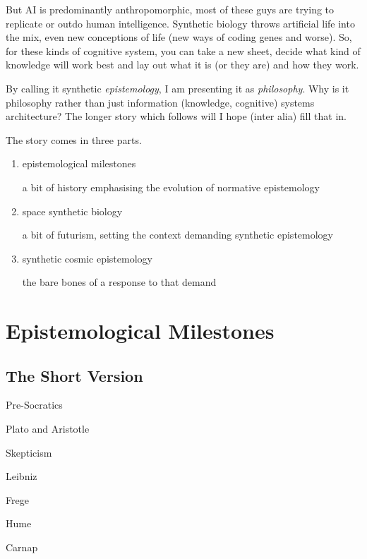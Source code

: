 \documentclass[14pt,titlepage]{extarticle}
\begin{document}
But AI is predominantly anthropomorphic, most of these guys are trying to replicate or outdo human intelligence.
Synthetic biology throws artificial life into the mix, even new conceptions of life (new ways of coding genes and worse).
So, for these kinds of cognitive system, you can take a new sheet, decide what kind of knowledge will work best and lay out what it is (or they are) and how they work.

By calling it synthetic {\it epistemology}, I am presenting it as {\it philosophy}.
Why is it philosophy rather than just information (knowledge, cognitive) systems architecture?
The longer story which follows will I hope (inter alia) fill that in.

The story comes in three parts.
\begin{enumerate}
\item epistemological milestones

  a bit of history emphasising the evolution of normative epistemology
  
\item space synthetic biology

  a bit of futurism, setting the context demanding synthetic epistemology
  
\item synthetic cosmic epistemology

  the bare bones of a response to that demand

\end{enumerate}

\section{Epistemological Milestones}

\subsection{The Short Version}

\begin{description}
\item Pre-Socratics
\item Plato and Aristotle
\item Skepticism
\item Leibniz
\item Frege
\item Hume
\item Carnap
\end{description}
\end{document}
